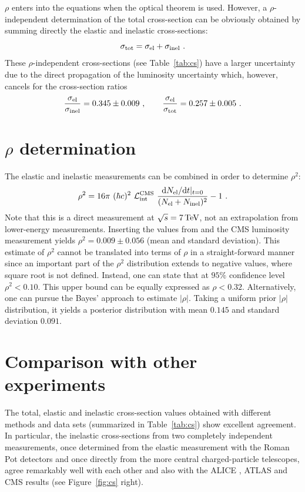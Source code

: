 \documentclass[doublecol]{epl/epl2}
\def\d{{\rm d}}
\def\un#1{\,{\rm #1}}
\begin{document}
$\rho$ enters into the equations when the optical theorem is used. However, a $\rho$-independent determination of the total cross-section can be obviously obtained by summing directly the elastic \cite{P1} and inelastic  \cite{P2} cross-sections:
\begin{equation}
\label{eq:m rho indep}
\sigma_{\rm tot} = \sigma_{\rm el} + \sigma_{\rm inel}\ .
\end{equation}
These $\rho$-independent cross-sections (see Table~\ref{tab:cs}) have a larger uncertainty due to the direct propagation of the luminosity uncertainty which, however, cancels for the cross-section ratios
$$
{\sigma_{\rm el} \over \sigma_{\rm inel}} = 0.345 \pm 0.009\ ,\qquad {\sigma_{\rm el}\over \sigma_{\rm tot}} = 0.257 \pm 0.005\ .
$$


\section{$\rho$ determination}

The elastic and inelastic measurements can be combined in order to determine $\rho^2$:
\begin{equation}
\label{eq:rho}
\rho^2 = 16\pi\ (\hbar c)^2\ {\cal L_{\rm int}^{\rm CMS}}\ {\d N_{\rm el}/\d t|_{t=0}\over (N_{\rm el} + N_{\rm inel})^2} - 1\ .
\end{equation}
Note that this is a direct measurement at $\sqrt s = 7\un{TeV}$, not an extrapolation from lower-energy measurements. Inserting the values from \cite{P1,P2} and the CMS luminosity measurement yields $\rho^2 = 0.009 \pm 0.056$ (mean and standard deviation). This estimate of $\rho^2$ cannot be translated into terms of $\rho$ in a straight-forward manner since an important part of the $\rho^2$ distribution extends to negative values, where square root is not defined. Instead, one can state that at $95\%$ confidence level $\rho^2 < 0.10$. This upper bound can be equally expressed as $\rho < 0.32$. Alternatively, one can pursue the Bayes' approach to estimate $|\rho|$. Taking a uniform prior $|\rho|$ distribution, it yields a posterior distribution with mean $0.145$ and standard deviation $0.091$.

\section{Comparison with other experiments}

The total, elastic and inelastic cross-section values obtained with different methods and data sets (summarized in Table~\ref{tab:cs}) show excellent agreement. In particular, the inelastic cross-sections from two completely independent measurements, once determined from the elastic measurement with the Roman Pot detectors and once directly from the more central charged-particle telescopes, agree remarkably well with each other and also with the ALICE \cite{alice_inel}, ATLAS \cite{atlas_inel} and CMS \cite{cms_inel} results (see Figure~\ref{fig:cs} right).
\end{document}
